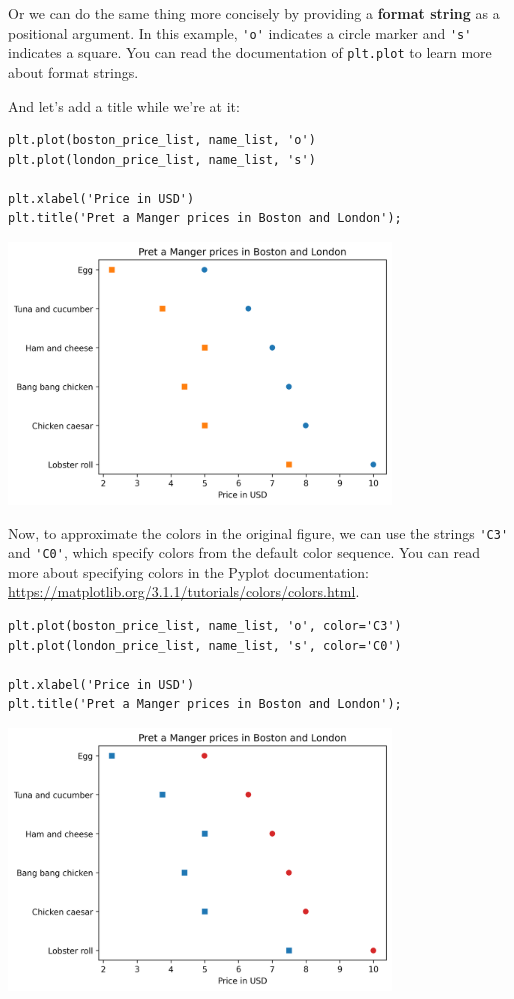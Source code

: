 Or we can do the same thing more concisely by providing a \textbf{format
string} as a positional argument. In this example,
\passthrough{\lstinline!'o'!} indicates a circle marker and
\passthrough{\lstinline!'s'!} indicates a square. You can read the
documentation of \passthrough{\lstinline!plt.plot!} to learn more about
format strings.

And let's add a title while we're at it:

\begin{lstlisting}[]
plt.plot(boston_price_list, name_list, 'o')
plt.plot(london_price_list, name_list, 's')

plt.xlabel('Price in USD')
plt.title('Pret a Manger prices in Boston and London');
\end{lstlisting}

\begin{center}
\includegraphics[width=4in]{chapters/06_plotting_files/06_plotting_42_0.png}
\end{center}

Now, to approximate the colors in the original figure, we can use the
strings \passthrough{\lstinline!'C3'!} and
\passthrough{\lstinline!'C0'!}, which specify colors from the default
color sequence. You can read more about specifying colors in the Pyplot
documentation:
\url{https://matplotlib.org/3.1.1/tutorials/colors/colors.html}.

\begin{lstlisting}[]
plt.plot(boston_price_list, name_list, 'o', color='C3')
plt.plot(london_price_list, name_list, 's', color='C0')

plt.xlabel('Price in USD')
plt.title('Pret a Manger prices in Boston and London');
\end{lstlisting}

\begin{center}
\includegraphics[width=4in]{chapters/06_plotting_files/06_plotting_44_0.png}
\end{center}

